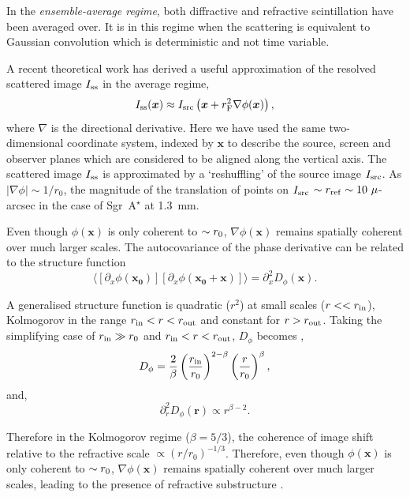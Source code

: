In the \emph{ensemble-average regime}, both diffractive and refractive scintillation have been averaged over. It is in this regime when the scattering is equivalent to Gaussian convolution which is deterministic and not time variable. 


A recent theoretical work \citep*{Johnson_2015a} has derived a useful approximation of the resolved scattered image $I_{\rm ss}$ in the average regime,
\begin{equation}\label{eq:scatterbrane}
I_{\rm ss}(\boldsymbol{x}) \approx I_{\rm src}\left(\boldsymbol{x} + r_{\rm F}^2 \nabla \phi(\boldsymbol{x})\right),
\end{equation}
where $\nabla$ is the directional derivative. Here we have used the same two-dimensional coordinate system, indexed by $\bm{x}$ to describe the source, screen and observer planes which are considered to be aligned along the vertical axis. The scattered image $I_{\rm ss}$ is approximated by a `reshuffling' of the source image $I_{\rm src}$. As $|\nabla\phi| \sim 1/r_0$, the magnitude of the translation of points on $I_{\rm src}$ $\sim r_{\rm ref} \sim 10\ \mu$-arcsec in the case of Sgr~A$^\star$ at 1.3~mm. 

Even though $\phi(\bm{x})$ is only coherent to $\sim r_{\rm 0}$, $\nabla \phi(\bm{x})$ remains spatially coherent over much larger scales. The autocovariance of the phase derivative can be related to the structure function \citep*{Johnson_2015a}
\begin{equation} 
\langle [ \partial_x \phi(\bm{x_0})] [ \partial_x \phi(\bm{x_0}+\bm{x})] \rangle = \partial_x^2 D_\phi(\bm{x}).
\end{equation}


A generalised structure function \citep{Tatarskii_1971, Narayan_1989} is quadratic ($r^2$) at small scales ($r<< r_{\rm in}$), Kolmogorov in the range $r_{\rm in}<r<r_{\rm out}$ and constant for $r>r_{\rm out}$. Taking the simplifying case of $r_{\rm in} \gg r_0$ and $r_{\rm in}<r<r_{\rm out}$, $D_\phi$ becomes \citep{Johnson_2013},
\begin{equation}
D_\phi = \frac{2}{\beta}\left( \frac{r_{\rm in}}{r_0}\right)^{2-\beta} \left( \frac{r}{r_0}\right)^\beta, 
\end{equation}
and, 
\begin{equation}
 \partial_r^2 D_\phi(\bm{r}) \propto r^{\beta-2}.
\end{equation}

Therefore in the Kolmogorov regime ($\beta = 5/3$), the coherence of image shift relative to the refractive scale $\propto (r/r_0)^{-1/3}$. Therefore, even though $\phi(\bm{x})$ is only coherent to $\sim r_{\rm 0}$, $\nabla \phi(\bm{x})$ remains spatially coherent over much larger scales, leading to the presence of refractive substructure \citep*{Johnson_2015a}.

